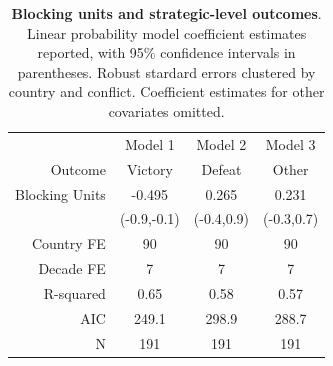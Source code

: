 \begin{table}[ht]
\centering
\caption{\textbf{Blocking units and strategic-level outcomes}. Linear probability model coefficient estimates reported, with 95\% confidence intervals in parentheses. Robust stardard errors clustered by country and conflict. Coefficient estimates for other covariates omitted.\\} 
\label{tab:fe_b}
\begingroup\footnotesize
\begin{tabular}{rccc}
  \toprule
 & Model 1 & Model 2 & Model 3 \\ 
 Outcome & Victory & Defeat & Other \\ 
   \midrule
Blocking Units & -0.495 & 0.265 & 0.231 \\ 
   & (-0.9,-0.1) & (-0.4,0.9) & (-0.3,0.7) \\ 
   \midrule
Country FE & 90 & 90 & 90 \\ 
  Decade FE & 7 & 7 & 7 \\ 
  R-squared & 0.65 & 0.58 & 0.57 \\ 
  AIC & 249.1 & 298.9 & 288.7 \\ 
  N & 191 & 191 & 191 \\ 
  \end{tabular}
\endgroup
\end{table}
